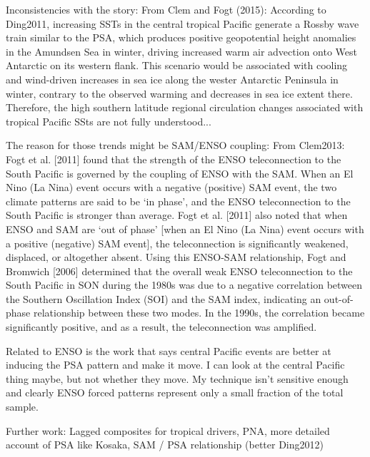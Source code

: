 Inconsistencies with the \citet{Ding2011} story: From Clem and Fogt (2015): According to Ding2011, increasing SSTs in the central tropical Pacific generate a Rossby wave train similar to the PSA, which produces positive geopotential height anomalies in the Amundsen Sea in winter, driving increased warm air advection onto West Antarctic on its western flank. This scenario would be associated with cooling and wind-driven increases in sea ice along the wester Antarctic Peninsula in winter, contrary to the observed warming and decreases in sea ice extent there. Therefore, the high southern latitude regional circulation changes associated with tropical Pacific SSts are not fully understood...

The reason for those trends might be SAM/ENSO coupling: From Clem2013: Fogt et al. [2011] found that the strength of the ENSO teleconnection to the South Pacific is governed by the coupling of ENSO with the SAM. When an El Nino (La Nina) event occurs with a negative (positive) SAM event, the two climate patterns are said to be ‘in phase’, and the ENSO teleconnection to the South Pacific is stronger than average. Fogt et al. [2011] also noted that when ENSO and SAM are ‘out of phase’ [when an El Nino (La Nina) event occurs with a positive (negative) SAM event], the teleconnection is significantly weakened, displaced, or altogether absent. Using this ENSO-SAM relationship, Fogt and Bromwich [2006] determined that the overall weak ENSO teleconnection to the South Pacific in SON during the 1980s was due to a negative correlation between the Southern Oscillation Index (SOI) and the SAM index, indicating an out-of-phase relationship between these two modes. In the 1990s, the correlation became significantly positive, and as a result, the teleconnection was amplified.

Related to ENSO is the work that says central Pacific events are better at inducing the PSA pattern and make it move. I can look at the central Pacific thing maybe, but not whether they move. My technique isn't sensitive enough and clearly ENSO forced patterns represent only a small fraction of the total sample.




Further work: Lagged composites for tropical drivers, PNA, more detailed account of PSA like Kosaka, SAM / PSA relationship (better Ding2012)